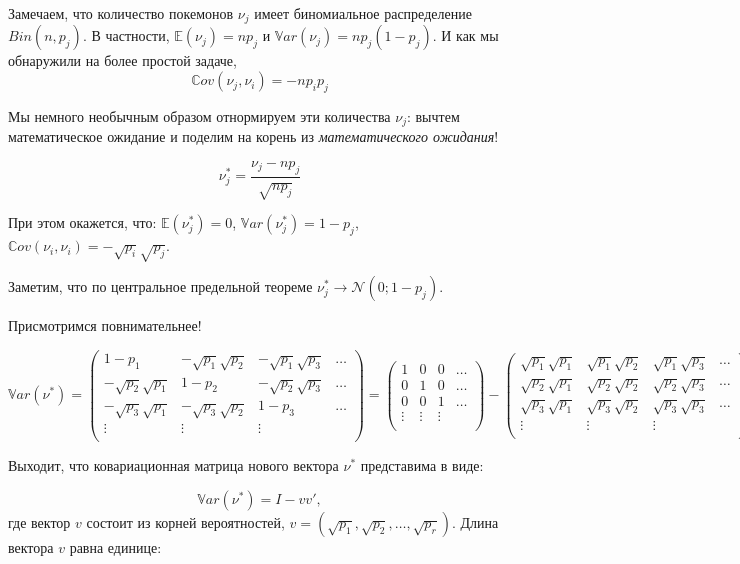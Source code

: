 \documentclass[11pt,russian,]{article}
\newcommand{\cN}{\mathcal{N}}
\newcommand{\E}{\mathbb{E}}
\newcommand{\1}{\mathbbm{1}}
\newcommand{\Var}{\mathbb{V}ar}
\newcommand{\Cov}{\mathbb{C}ov}
\begin{document}
Замечаем, что количество покемонов \(\nu_j\) имеет биномиальное
распределение \(Bin(n, p_j)\). В частности, \(\E(\nu_j) = np_j\) и
\(\Var(\nu_j)=n p_j (1- p_j)\). И как мы обнаружили на более простой
задаче, \[
\Cov(\nu_j, \nu_i) = -np_ip_j
\]

Мы немного необычным образом отнормируем эти количества \(\nu_j\):
вычтем математическое ожидание и поделим на корень из
\emph{математического ожидания}!

\[
\nu_j^* = \frac{\nu_j - np_j}{\sqrt{np_j}}
\]

При этом окажется, что: \(\E(\nu_j^*) = 0\),
\(\Var(\nu_j^*) = 1 - p_j\),
\(\Cov(\nu_i, \nu_i) = - \sqrt{p_i}\sqrt{p_j}\).

Заметим, что по центральное предельной теореме
\(\nu_j^* \to \cN(0; 1 - p_j)\).

Присмотримся повнимательнее!

\[
\Var(\nu^*) = \begin{pmatrix}
1 - p_1 & -\sqrt{p_1}\sqrt{p_2} & -\sqrt{p_1}\sqrt{p_3} & \ldots \\
-\sqrt{p_2}\sqrt{p_1} & 1 - p_2 & -\sqrt{p_2}\sqrt{p_3} & \ldots \\
-\sqrt{p_3}\sqrt{p_1} & -\sqrt{p_3}\sqrt{p_2} & 1 - p_3  & \ldots \\
\vdots & \vdots & \vdots &  \\
\end{pmatrix} = 
\begin{pmatrix}
1 & 0 & 0 & \ldots \\
0 & 1 & 0 & \ldots \\
0 & 0 & 1 & \ldots \\
\vdots & \vdots & \vdots &  \\
\end{pmatrix} - \begin{pmatrix}
\sqrt{p_1}\sqrt{p_1} & \sqrt{p_1}\sqrt{p_2} & \sqrt{p_1}\sqrt{p_3} & \ldots \\
\sqrt{p_2}\sqrt{p_1} & \sqrt{p_2}\sqrt{p_2} & \sqrt{p_2}\sqrt{p_3} & \ldots \\
\sqrt{p_3}\sqrt{p_1} & \sqrt{p_3}\sqrt{p_2} & \sqrt{p_3}\sqrt{p_3}  & \ldots \\
\vdots & \vdots & \vdots &  \\
\end{pmatrix}
\]

Выходит, что ковариационная матрица нового вектора \(\nu^*\) представима
в виде:

\[
\Var(\nu^*) = I - vv',
\] где вектор \(v\) состоит из корней вероятностей,
\(v= (\sqrt{p_1}, \sqrt{p_2}, \ldots, \sqrt{p_r})\). Длина вектора \(v\)
равна единице:
\end{document}
